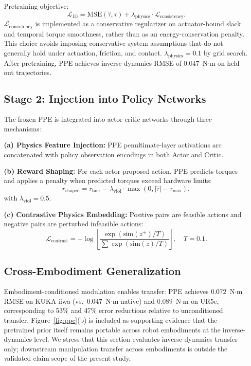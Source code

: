 \documentclass[12pt]{article}
\begin{document}
Pretraining objective:
\[
\mathcal{L}_{\mathrm{ID}} =
\mathrm{MSE}(\hat{\tau}, \tau) +
\lambda_{\mathrm{physics}} \cdot
\mathcal{L}_{\mathrm{consistency}}.
\]
$\mathcal{L}_{\mathrm{consistency}}$ is implemented as a conservative regularizer on actuator-bound slack and temporal torque smoothness, rather than as an energy-conservation penalty. This choice avoids imposing conservative-system assumptions that do not generally hold under actuation, friction, and contact. $\lambda_{\mathrm{physics}} = 0.1$ by grid search. After pretraining, PPE achieves inverse-dynamics RMSE of $0.047$~N$\cdot$m on held-out trajectories.

\subsection{Stage 2: Injection into Policy Networks}

The frozen PPE is integrated into actor-critic networks through three mechanisms:

\textbf{(a) Physics Feature Injection:} PPE penultimate-layer activations are concatenated with policy observation encodings in both Actor and Critic.

\textbf{(b) Reward Shaping:} For each actor-proposed action, PPE predicts torques and applies a penalty when predicted torques exceed hardware limits:
\[
r_{\mathrm{shaped}} =
r_{\mathrm{task}} -
\lambda_{\mathrm{viol}} \cdot
\max(0, |\hat{\tau}| - \tau_{\max}),
\]
with $\lambda_{\mathrm{viol}} = 0.5$.

\textbf{(c) Contrastive Physics Embedding:} Positive pairs are feasible actions and negative pairs are perturbed infeasible actions:
\[
\mathcal{L}_{\mathrm{contrast}} =
-\log
\left[
\frac{\exp(\mathrm{sim}(z^+)/T)}
{\sum \exp(\mathrm{sim}(z)/T)}
\right], \quad T = 0.1.
\]

\subsection{Cross-Embodiment Generalization}

Embodiment-conditioned modulation enables transfer: PPE achieves $0.072$~N$\cdot$m RMSE on KUKA iiwa (vs.\ $0.047$~N$\cdot$m native) and $0.089$~N$\cdot$m on UR5e, corresponding to 53\% and 47\% error reductions relative to unconditioned transfer. Figure~\ref{fig:ppe}(b) is included as supporting evidence that the pretrained prior itself remains portable across robot embodiments at the inverse-dynamics level. We stress that this section evaluates inverse-dynamics transfer only; downstream manipulation transfer across embodiments is outside the validated claim scope of the present study.
\end{document}
